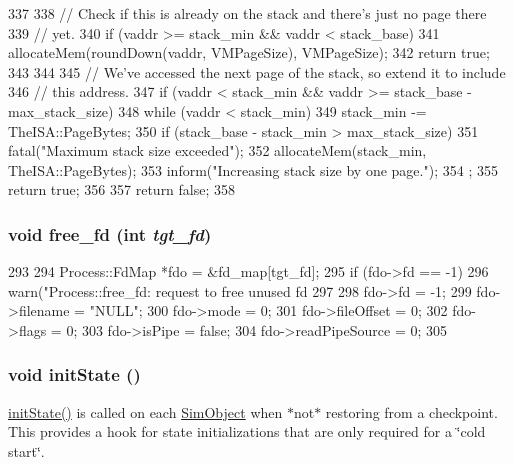 \begin{DoxyCode}
337 {
338     // Check if this is already on the stack and there's just no page there
339     // yet.
340     if (vaddr >= stack_min && vaddr < stack_base) {
341         allocateMem(roundDown(vaddr, VMPageSize), VMPageSize);
342         return true;
343     }
344 
345     // We've accessed the next page of the stack, so extend it to include
346     // this address.
347     if (vaddr < stack_min && vaddr >= stack_base - max_stack_size) {
348         while (vaddr < stack_min) {
349             stack_min -= TheISA::PageBytes;
350             if (stack_base - stack_min > max_stack_size)
351                 fatal("Maximum stack size exceeded\n");
352             allocateMem(stack_min, TheISA::PageBytes);
353             inform("Increasing stack size by one page.");
354         };
355         return true;
356     }
357     return false;
358 }
\end{DoxyCode}
\hypertarget{classProcess_a8c39614271eb6220f2db1bd774f43849}{
\subsubsection[{free\_\-fd}]{\setlength{\rightskip}{0pt plus 5cm}void free\_\-fd (int {\em tgt\_\-fd})}}
\label{classProcess_a8c39614271eb6220f2db1bd774f43849}



\begin{DoxyCode}
293 {
294     Process::FdMap *fdo = &fd_map[tgt_fd];
295     if (fdo->fd == -1)
296         warn("Process::free_fd: request to free unused fd %
297 
298     fdo->fd = -1;
299     fdo->filename = "NULL";
300     fdo->mode = 0;
301     fdo->fileOffset = 0;
302     fdo->flags = 0;
303     fdo->isPipe = false;
304     fdo->readPipeSource = 0;
305 }
\end{DoxyCode}
\hypertarget{classProcess_a3c34ea9b29f410748d4435a667484924}{
\subsubsection[{initState}]{\setlength{\rightskip}{0pt plus 5cm}void initState ()}}
\label{classProcess_a3c34ea9b29f410748d4435a667484924}
\hyperlink{classProcess_a3c34ea9b29f410748d4435a667484924}{initState()} is called on each \hyperlink{classSimObject}{SimObject} when $\ast$not$\ast$ restoring from a checkpoint. This provides a hook for state initializations that are only required for a \char`\"{}cold start\char`\"{}. 

